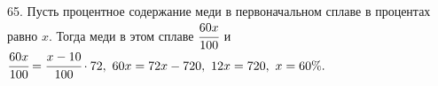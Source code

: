 65. Пусть процентное содержание меди в первоначальном сплаве в процентах равно $x.$ Тогда меди в этом сплаве $\cfrac{60x}{100}$ и $\cfrac{60x}{100}=\cfrac{x-10}{100}\cdot72,\ 60x=72x-720,\ 12x=720,\ x=60\%.$\\
